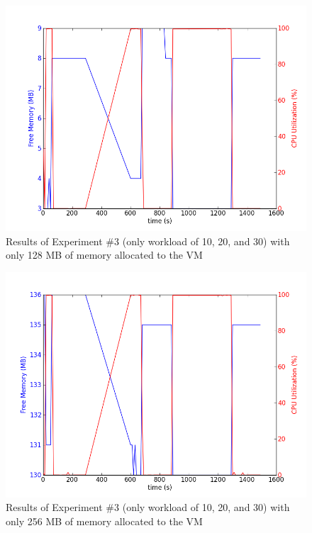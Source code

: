 \documentclass{article}
\begin{document}
  \begin{figure}
    \begin{center}
      \includegraphics[scale=0.50]{ex4Mem=128.png} 
      \caption{Results of Experiment \#3 (only workload of 10, 20, and
      30) with only 128 MB of memory allocated to the VM}
      \label{fig:ex4Mem128}
    \end{center}
  \end{figure}

  \begin{figure}
    \begin{center}
      \includegraphics[scale=0.50]{ex4Mem=256.png} 
      \caption{Results of Experiment \#3 (only workload of 10, 20, and
      30) with only 256 MB of memory allocated to the VM}
      \label{fig:ex4Mem256}
    \end{center}
  \end{figure}
\end{document}
